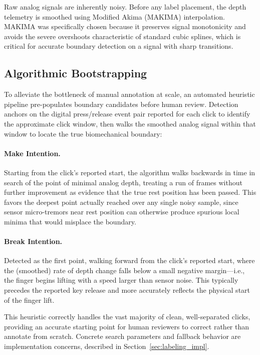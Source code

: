 Raw analog signals are inherently noisy. Before any label placement, the depth telemetry is smoothed using Modified Akima (MAKIMA) interpolation. MAKIMA was specifically chosen because it preserves signal monotonicity and avoids the severe overshoots characteristic of standard cubic splines, which is critical for accurate boundary detection on a signal with sharp transitions.

\subsection{Algorithmic Bootstrapping}
To alleviate the bottleneck of manual annotation at scale, an automated heuristic pipeline pre-populates boundary candidates before human review. Detection anchors on the digital press/release event pair reported for each click to identify the approximate click window, then walks the smoothed analog signal within that window to locate the true biomechanical boundary:

\paragraph{Make Intention.} Starting from the click's reported start, the algorithm walks backwards in time in search of the point of minimal analog depth, treating a run of frames without further improvement as evidence that the true rest position has been passed. This favors the deepest point actually reached over any single noisy sample, since sensor micro-tremors near rest position can otherwise produce spurious local minima that would misplace the boundary.

\paragraph{Break Intention.} Detected as the first point, walking forward from the click's reported start, where the (smoothed) rate of depth change falls below a small negative margin---i.e., the finger begins lifting with a speed larger than sensor noise. This typically precedes the reported key release and more accurately reflects the physical start of the finger lift.

This heuristic correctly handles the vast majority of clean, well-separated clicks, providing an accurate starting point for human reviewers to correct rather than annotate from scratch. Concrete search parameters and fallback behavior are implementation concerns, described in Section~\ref{sec:labeling_impl}.

